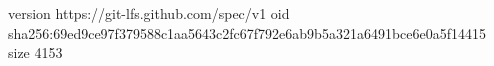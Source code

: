 version https://git-lfs.github.com/spec/v1
oid sha256:69ed9ce97f379588c1aa5643c2fc67f792e6ab9b5a321a6491bce6e0a5f14415
size 4153
